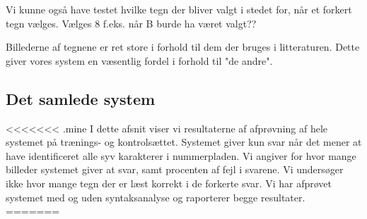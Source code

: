 Vi kunne også have testet hvilke tegn der bliver valgt i stedet for, når et forkert tegn vælges. Vælges 8 f.eks. når B burde ha været valgt??

Billederne af tegnene er ret store i forhold til dem der bruges i litteraturen. Dette giver vores system en væsentlig fordel i forhold til "de andre".




 %







\subsection{Det samlede system}
<<<<<<< .mine
I dette afsnit viser vi resultaterne af afprøvning af hele systemet på trænings- og kontrolsættet. Systemet giver kun svar når det mener at have identificeret alle syv karakterer i nummerpladen. Vi angiver for hvor mange billeder systemet giver at svar, samt procenten af fejl i svarene. Vi undersøger ikke hvor mange tegn der er læst korrekt i de forkerte svar. Vi har afprøvet systemet med og uden syntaksanalyse og raporterer begge resultater.
=======
\label{sec:test:samlet_system}

